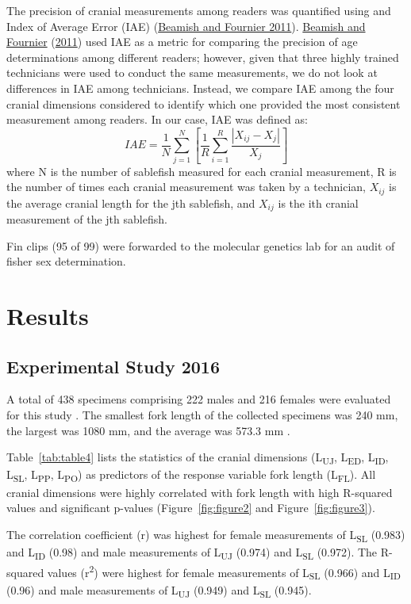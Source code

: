 \documentclass[12pt]{article}\usepackage[]{graphicx}\usepackage[]{color}
\begin{document}
The precision of cranial measurements among readers was quantified using and Index of Average Error (IAE) (\protect\hyperlink{ref-Beamish1981}{Beamish and Fournier 2011}). \protect\hyperlink{ref-Beamish1981}{Beamish and Fournier} (\protect\hyperlink{ref-Beamish1981}{2011}) used IAE as a metric for comparing the precision of age determinations among different readers; however, given that three highly trained technicians were used to conduct the same measurements, we do not look at differences in IAE among technicians. Instead, we compare IAE among the four cranial dimensions considered to identify which one provided the most consistent measurement among readers. In our case, IAE was defined as: \[
IAE=\frac{1}{N}\sum_{j = 1}^{N}\left[\frac{1}{R}\sum_{i = 1}^{R}\frac{|X_{ij} - X_j|}{X_j}\right]
\] where N is the number of sablefish measured for each cranial measurement, R is the number of times each cranial measurement was taken by a technician, \(X_{ij}\) is the average cranial length for the jth sablefish, and \(X_{ij}\) is the ith cranial measurement of the jth sablefish.

Fin clips (95 of 99) were forwarded to the molecular genetics lab for an audit of fisher sex determination.

\hypertarget{results}{%
\section{Results}\label{results}}

\hypertarget{experimental-study-2016-1}{%
\subsection{Experimental Study 2016}\label{experimental-study-2016-1}}

A total of 438 specimens comprising 222 males and 216 females were evaluated for this study . The smallest fork length of the collected specimens was 240 mm, the largest was 1080 mm, and the average was 573.3 mm .

Table~\ref{tab:table4} lists the statistics of the cranial dimensions (L\textsubscript{UJ}, L\textsubscript{ED}, L\textsubscript{ID}, L\textsubscript{SL}, L\textsubscript{PP}, L\textsubscript{PO}) as predictors of the response variable fork length (L\textsubscript{FL}). All cranial dimensions were highly correlated with fork length with high R-squared values and significant p-values (Figure~\ref{fig:figure2} and Figure~\ref{fig:figure3}).

The correlation coefficient (r) was highest for female measurements of L\textsubscript{SL} (0.983) and L\textsubscript{ID} (0.98) and male measurements of L\textsubscript{UJ} (0.974) and L\textsubscript{SL} (0.972). The R-squared values (r\textsuperscript{2}) were highest for female measurements of L\textsubscript{SL} (0.966) and L\textsubscript{ID} (0.96) and male measurements of L\textsubscript{UJ} (0.949) and L\textsubscript{SL} (0.945).
\end{document}
